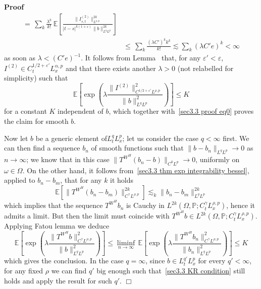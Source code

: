 \documentclass[10pt]{article}
\newcommand{\tmcolor}[2]{{\color{#1}{#2}}}
\newenvironment{proof}{\noindent\textbf{Proof\ }}{\hspace*{\fill}$\Box$\medskip}
\begin{document}
\begin{proof}
\begin{align*}
    = \, \sum_k \frac{\lambda^k}{k!} \, \mathbb{E} \left[ \frac{\| I^{(2)}_{s,
    t} \|_{L^{\rho, p}}^{2 k}}{| t - s |^{k (1 + \varepsilon)} \| b \|^{2
    k}_{L^q L^p}} \right]\\
    & \leqslant \, \sum_k \frac{(\lambda C')^k k^k}{k!} \lesssim \sum_k
    (\lambda C' e)^k < \infty
  \end{align*}
%  
  as soon as $\lambda < (C' e)^{- 1}$. It follows from
  Lemma~\tmcolor{blue}{\tmcolor{black}{\ref{appendixA1 chaining lemma}}} that,
  for any $\varepsilon' < \varepsilon$, $I^{(2)} \in C_t^{1 / 2 +
  \varepsilon'} L_x^{\alpha, p}$ and that there exists another $\lambda > 0$
  (not relabelled for simplicity) such that
  \begin{equation}
    \mathbb{E} \left[ \exp \left( \lambda \frac{\| I^{(2)} \|^2_{C^{1 / 2 +
    \varepsilon'} L^{\rho, p}}}{\| b \|^2_{L^q L^p}} \right) \right] \leqslant
    K \label{sec3.3 proof eq2}
  \end{equation}
  for a constant $K$ independent of $b$, which together with~{\eqref{sec3.3
  proof eq0}} proves the claim for smooth $b$.
  
  Now let $b$ be a generic element of$L^q_t L^p_x$; let us consider the case
  $q < \infty$ first. We can then find a sequence $b_n$ of smooth functions
  such that $\| b - b_n \|_{L^q L^p} \rightarrow 0$ as $n \rightarrow \infty$;
  we know that in this case $\| T^{W^H} (b_n - b) \|_{C^0 L^p} \rightarrow 0$,
  uniformly on $\omega \in \Omega$. On the other hand, it follows
  from~{\eqref{sec3.3 thm exp integrability bessel}}, applied to $b_n - b_m$,
  that for any $k$ it holds
  \[ \mathbb{E} [\| T^{W^H} (b_n - b_m) \|^{2 k}_{C^{\gamma} L^{\rho, p}}]
     \lesssim_k \| b_n - b_m \|^{2 k}_{L^q L^p} \]
  which implies that the sequence $T^{W^H} b_n$ is Cauchy in $L^{2 k} (\Omega,
  \mathbb{P}; C_t^{\gamma} L_x^{\rho, p})$, hence it admits a limit. But then
  the limit must coincide with $T^{W^H} b \in L^{2 k} (\Omega, \mathbb{P};
  C_t^{\gamma} L_x^{\rho, p})$. Applying Fatou lemma we deduce
  \[ \mathbb{E} \left[ \exp \left( \lambda \frac{\| T^{W^H} b \|^2_{C^{\gamma}
     L^{\rho, p}}}{\| b \|_{L^q L^p}^2} \right) \right] \leqslant \liminf_{n
     \rightarrow \infty} \, \mathbb{E} \left[ \exp \left( \lambda \frac{\|
     T^{W^H} b_n \|^2_{C^{\gamma} L^{\rho, p}}}{\| b_n \|_{L^q L^p}^2} \right)
     \right] \leqslant K \]
  which gives the conclusion. In the case $q = \infty$, since $b \in L^{q'}_t
  L^p_x$ for every $q' < \infty$, for any fixed $\rho$ we can find $q'$ big
  enough such that~{\eqref{sec3.3 KR condition}} still holds and apply the
  result for such $q'$.
\end{proof}
\end{document}
